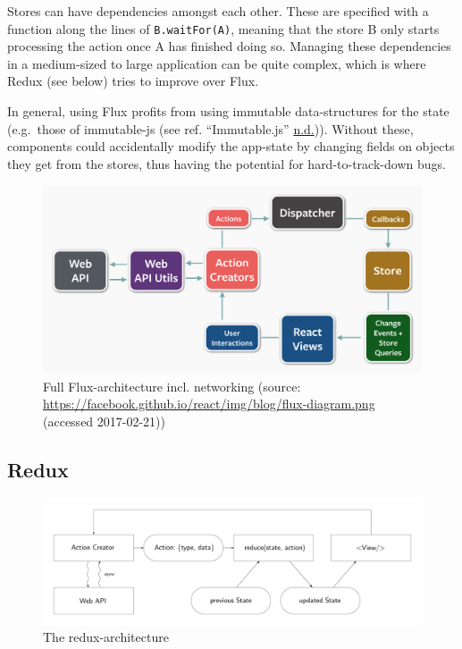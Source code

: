 \documentclass[a4paper,,tablecaptionabove]{scrbook}
\newcommand{\passthrough}[1]{#1}
\begin{document}
Stores can have dependencies amongst each other. These are specified
with a function along the lines of
\passthrough{\lstinline!B.waitFor(A)!}, meaning that the store B only
starts processing the action once A has finished doing so. Managing
these dependencies in a medium-sized to large application can be quite
complex, which is where Redux (see below) tries to improve over Flux.

In general, using Flux profits from using immutable data-structures for
the state (e.g.~those of immutable-js (see ref. ``Immutable.js''
\protect\hyperlink{ref-Immutablejs}{n.d.})). Without these, components
could accidentally modify the app-state by changing fields on objects
they get from the stores, thus having the potential for
hard-to-track-down bugs.

\begin{figure}
\hypertarget{fig:flux_full}{%
\centering
\includegraphics{./tex2pdf.11982/f036eec1d3c2a11ed0dc84a745047c5dd18c1c54.png}
\caption{Full Flux-architecture incl. networking (source:
\url{https://facebook.github.io/react/img/blog/flux-diagram.png}
(accessed 2017-02-21))}\label{fig:flux_full}
}
\end{figure}

\hypertarget{sec:redux}{%
\subsection{Redux}\label{sec:redux}}

\begin{figure}
\hypertarget{fig:redux}{%
\centering
\includegraphics{./tex2pdf.11982/fbb34679c91fab49f2e56b3dc5b44cbbff8e99ee.pdf}
\caption{The redux-architecture}\label{fig:redux}
}
\end{figure}
\end{document}
